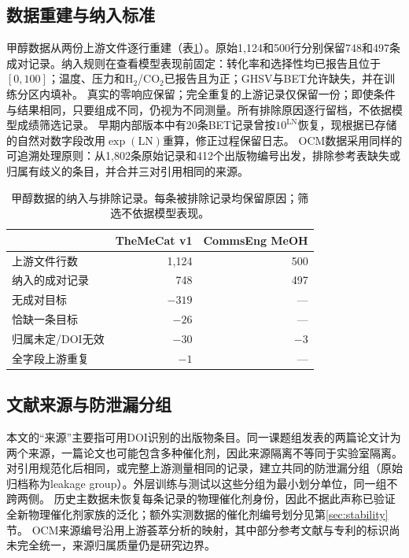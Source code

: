 \documentclass[11pt,a4paper]{article}
\begin{document}
\subsection{数据重建与纳入标准}
甲醇数据从两份上游文件逐行重建（表\ref{tab:ledger}）。原始1,124和500行分别保留748和497条成对记录。纳入规则在查看模型表现前固定：转化率和选择性均已报告且位于$[0,100]$；温度、压力和H$_2$/CO$_2$已报告且为正；GHSV与BET允许缺失，并在训练分区内填补。
真实的零响应保留；完全重复的上游记录仅保留一份；即使条件与结果相同，只要组成不同，仍视为不同测量。所有排除原因逐行留档，不依据模型成绩筛选记录。
早期内部版本中有20条BET记录曾按$10^{\mathrm{LN}}$恢复，现根据已存储的自然对数字段改用$\exp(\mathrm{LN})$重算，修正过程保留日志。
OCM数据采用同样的可追溯处理原则：从1,802条原始记录和412个出版物编号出发，排除参考表缺失或归属有歧义的条目，并合并三对引用相同的来源。
\begin{table}[t]
\centering\small
\caption{甲醇数据的纳入与排除记录。每条被排除记录均保留原因；筛选不依据模型表现。}
\label{tab:ledger}
\begin{tabular}{lrr}
\toprule
 & TheMeCat v1 & CommsEng MeOH \\
\midrule
上游文件行数 & 1{,}124 & 500 \\
纳入的成对记录 & 748 & 497 \\
无成对目标 & $-319$ & --- \\
恰缺一条目标 & $-26$ & --- \\
归属未定/DOI无效 & $-30$ & $-3$ \\
全字段上游重复 & $-1$ & --- \\
\bottomrule
\end{tabular}
\end{table}

\subsection{文献来源与防泄漏分组}
本文的“来源”主要指可用DOI识别的出版物条目。同一课题组发表的两篇论文计为两个来源，一篇论文也可能包含多种催化剂，因此来源隔离不等同于实验室隔离。
对引用规范化后相同，或完整上游测量相同的记录，建立共同的防泄漏分组（原始归档称为leakage group）。外层训练与测试以这些分组为最小划分单位，同一组不跨两侧。
历史主数据未恢复每条记录的物理催化剂身份，因此不据此声称已验证全新物理催化剂家族的泛化；额外实测数据的催化剂编号划分见第\ref{sec:stability}节。
OCM来源编号沿用上游荟萃分析的映射，其中部分参考文献与专利的标识尚未完全统一，来源归属质量仍是研究边界。
\end{document}
